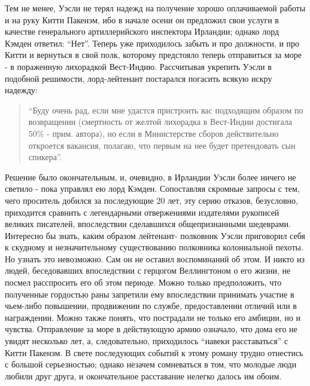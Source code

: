 \documentclass[
  oneside,
  12pt,
  titlepage]{book}
\begin{document}
Тем не менее, Уэсли не терял надежд на получение хорошо оплачиваемой работы и на руку Китти Пакенэм, ибо в начале осени он предложил свои услуги в качестве генерального артиллерийского инспектора Ирландии; однако лорд Кэмден ответил: ``Нет''. Теперь уже приходилось забыть и про должности, и про Китти и вернуться в свой полк, которому предстояло теперь отправиться за море - в пораженную лихорадкой Вест-Индию. Рассчитывая укрепить Уэсли в подобной решимости, лорд-лейтенант постарался погасить всякую искру надежду:

\begin{quote}
``Буду очень рад, если мне удастся пристроить вас подходящим образом по возвращении (смертность от желтой лихорадка в Вест-Индии достигала 50\% - прим. автора), но если в Министерстве сборов действительно откроется вакансия, полагаю, что первым на нее будет претендовать сын спикера''.
\end{quote}

Решение было окончательным, и, очевидно, в Ирландии Уэсли более ничего не светило - пока управлял ею лорд Кэмден. Сопоставляя скромные запросы с тем, чего проситель добился за последующие 20 лет, эту серию отказов, безусловно, приходится сравнить с легендарными отвержениями издателями рукописей великих писателей, впоследствии сделавшихся общепризнанными шедеврами. Интересно бы знать, каким образом лейтенант- полковник Уэсли приговорил себя к скудному и незначительному существованию полковника колониальной пехоты. Но узнать это невозможно. Сам он не оставил воспоминаний об этом. И никто из людей, беседовавших впоследствии с герцогом Веллингтоном о его жизни, не посмел расспросить его об этом периоде. Можно только предположить, что полученные гордостью раны запретили ему впоследствии принимать участие в чьем-либо повышении, продвижении по службе, предоставлении отличий или в награждении. Можно также понять, что пострадали не только его амбиции, но и чувства. Отправление за море в действующую армию означало, что дома его не увидят несколько лет, а, следовательно, приходилось ``навеки расставаться'' с Китти Пакенэм. В свете последующих событий к этому роману трудно отнестись с большой серьезностью; однако незачем сомневаться в том, что молодые люди любили друг друга, и окончательное расставание нелегко далось им обоим.
\end{document}
